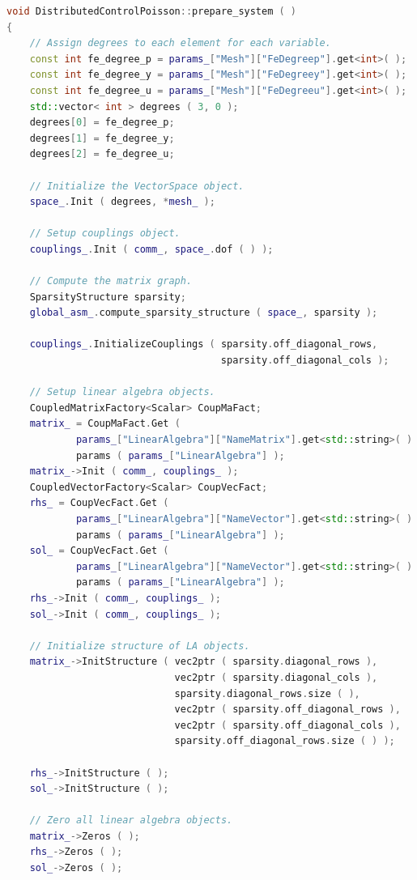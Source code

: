 \documentclass[a4paper, 11pt, twoside]{article}
\begin{document}
\begin{lstlisting}[language=C++, basicstyle={\footnotesize, \ttfamily}, keywordstyle=\color{blue}, numbers=none, tabsize=4]
void DistributedControlPoisson::prepare_system ( )
{
    // Assign degrees to each element for each variable.
    const int fe_degree_p = params_["Mesh"]["FeDegreep"].get<int>( );
    const int fe_degree_y = params_["Mesh"]["FeDegreey"].get<int>( );
    const int fe_degree_u = params_["Mesh"]["FeDegreeu"].get<int>( );
    std::vector< int > degrees ( 3, 0 );
    degrees[0] = fe_degree_p;
    degrees[1] = fe_degree_y;
    degrees[2] = fe_degree_u;

    // Initialize the VectorSpace object.
    space_.Init ( degrees, *mesh_ );

    // Setup couplings object.
    couplings_.Init ( comm_, space_.dof ( ) );

    // Compute the matrix graph.
    SparsityStructure sparsity;
    global_asm_.compute_sparsity_structure ( space_, sparsity );

    couplings_.InitializeCouplings ( sparsity.off_diagonal_rows,
                                     sparsity.off_diagonal_cols );

    // Setup linear algebra objects.
    CoupledMatrixFactory<Scalar> CoupMaFact;
    matrix_ = CoupMaFact.Get (
            params_["LinearAlgebra"]["NameMatrix"].get<std::string>( ) )->
            params ( params_["LinearAlgebra"] );
    matrix_->Init ( comm_, couplings_ );
    CoupledVectorFactory<Scalar> CoupVecFact;
    rhs_ = CoupVecFact.Get (
            params_["LinearAlgebra"]["NameVector"].get<std::string>( ) )->
            params ( params_["LinearAlgebra"] );
    sol_ = CoupVecFact.Get (
            params_["LinearAlgebra"]["NameVector"].get<std::string>( ) )->
            params ( params_["LinearAlgebra"] );
    rhs_->Init ( comm_, couplings_ );
    sol_->Init ( comm_, couplings_ );

    // Initialize structure of LA objects.
    matrix_->InitStructure ( vec2ptr ( sparsity.diagonal_rows ),
                             vec2ptr ( sparsity.diagonal_cols ),
                             sparsity.diagonal_rows.size ( ),
                             vec2ptr ( sparsity.off_diagonal_rows ),
                             vec2ptr ( sparsity.off_diagonal_cols ),
                             sparsity.off_diagonal_rows.size ( ) );

    rhs_->InitStructure ( );
    sol_->InitStructure ( );

    // Zero all linear algebra objects.
    matrix_->Zeros ( );
    rhs_->Zeros ( );
    sol_->Zeros ( );


\end{lstlisting}
\end{document}
